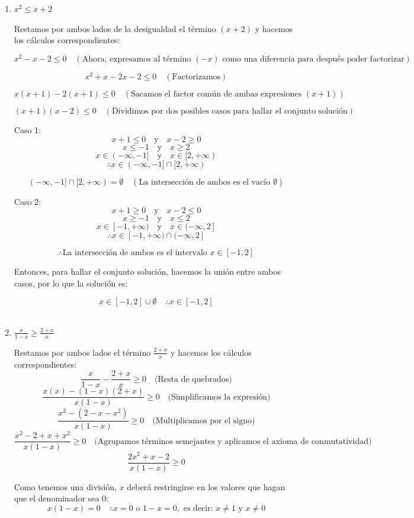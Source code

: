 \documentclass{article}
\begin{document}
\begin{enumerate}
  \item \(x^2\leq x+2\)
  
Restamos por ambos lados de la desigualdad el término \((x+2)\) y hacemos los cálculos correspondientes:

\[ x^2 - x - 2 \leq 0 \quad (\text{Ahora, expresamos al término } (-x) \text{ como una diferencia para después poder factorizar}) \]

\[ x^2 + x - 2x - 2 \leq 0 \quad (\text{Factorizamos}) \]

\[ x(x+1) - 2(x+1) \leq 0 \quad (\text{Sacamos el factor común de ambas expresiones } (x+1)) \]

\[ (x+1)(x-2) \leq 0 \quad (\text{Dividimos por dos posibles casos para hallar el conjunto solución}) \]

Caso 1:
\[ x+1 \leq 0 \quad \text{y} \quad x-2 \geq 0 \]
\[ x \leq -1 \quad \text{y} \quad x \geq 2 \]
\[ x \in (-\infty, -1] \quad \text{y} \quad x \in [2, +\infty) \]
\[\therefore x \in (-\infty, -1] \cap [2, +\infty)\]

\[(-\infty, -1] \cap [2, +\infty) = \emptyset \quad (\text{La intersección de ambos es el vacío } \emptyset )\]

Caso 2:
\[ x+1 \geq 0 \quad \text{y} \quad x-2 \leq 0 \]
\[ x \geq -1 \quad \text{y} \quad x \leq 2 \]
\[ x \in [-1, +\infty) \quad \text{y} \quad x \in (-\infty, 2] \]
\[\therefore x \in [-1, +\infty) \cap (-\infty, 2]\]

\[\therefore \text{La intersección de ambos es el intervalo } x \in [-1, 2]\]

Entonces, para hallar el conjunto solución, hacemos la unión entre ambos casos, por lo que la solución es:

\[ x \in [-1,2] \cup \emptyset \quad \therefore x \in [-1,2] \]\\


  \item \(\frac{x}{1-x}\geq\frac{2+x}{x}\)

Restamos por ambos lados el término $\frac{2+x}{x}$ y hacemos los cálculos correspondientes:
\[
\frac{x}{1-x} - \frac{2+x}{x} \geq 0 \quad \text{(Resta de quebrados)}
\]
\[
\frac{x(x) - (1-x)(2+x)}{x(1-x)} \geq 0 \quad \text{(Simplificamos la expresión)}
\]
\[
\frac{x^2 - (2-x-x^2)}{x(1-x)} \geq 0 \quad \text{(Multiplicamos por el signo)}
\]
\[
\frac{x^2 - 2 + x + x^2}{x(1-x)} \geq 0 \quad \text{(Agrupamos términos semejantes y aplicamos el axioma de conmutatividad)}
\]
\[
\frac{2x^2 + x - 2}{x(1-x)} \geq 0
\]

Como tenemos una división, \(x\) deberá restringirse en los valores que hagan que el denominador sea 0:
\[
x(1-x) = 0 \quad \therefore x = 0 \text{ o } 1-x = 0, \text{ es decir: } x \neq 1 \text{ y } x \neq 0
\]


\end{enumerate}
\end{document}
